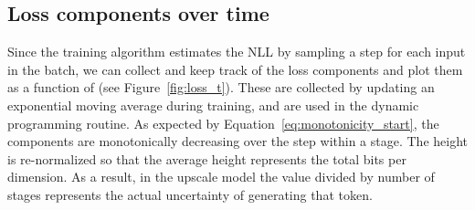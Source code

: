 \documentclass{article} \usepackage{iclr2022_conference,times}
\begin{document}
\begin{table}
\vspace{-.3cm}
\centering
\begin{table}[H]
    \centering
    \caption{Audio (SC09) depth upscaling test set performance (in bpd) for various computational budgets.}
    \label{tab:depth_upscaling_sc09_budget}
\end{table}
\end{table}

\subsection{Loss components over time}
Since the training algorithm estimates the NLL by sampling a step  for each input in the batch, we can collect and keep track of the loss components  and plot them as a function of  (see Figure~\ref{fig:loss_t}). These are collected by updating an exponential moving average during training, and are used in the dynamic programming routine. As expected by Equation~\ref{eq:monotonicity_start}, the components  are monotonically decreasing over the step  within a stage. The height is re-normalized so that the average height represents the total bits per dimension. As a result, in the upscale model the value divided by number of stages  represents the actual uncertainty of generating that token.
\end{document}
